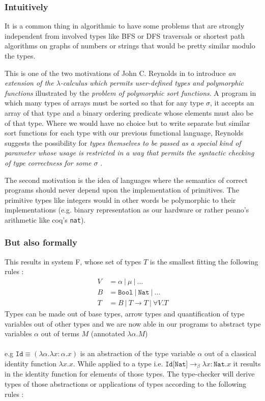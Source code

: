 \documentclass{article}
\begin{document}
    \subsubsection{Intuitively}
    It is a common thing in algorithmic to have some problems that are strongly independent from involved types like BFS or DFS traversals or shortest path algorithms on graphs of numbers or strings that would be pretty similar modulo the types.\par
    This is one of the two motivations of John C. Reynolds in \cite{Reynolds1974TowardsAT} to introduce \textit{an extension of the $\lambda$-calculus which permits user-defined types and polymorphic functions} illustrated by the \textit{problem of polymorphic sort functions}. A program in which many types of arrays must be sorted so that for any type $\sigma$, it accepts an array of that type and a binary ordering predicate whose elements must also be of that type. Where we would have no choice but to write separate but similar sort functions for each type with our previous functional language, Reynolds suggests the possibility for \textit{types themselves to be passed as a special kind of parameter whose usage is restricted in a way that permits the syntactic checking of type correctness for some $\sigma$ }.\par
    The second motivation is the idea of languages where the semantics of correct programs should never depend upon the implementation of primitives. The primitive types like integers would in other words be polymorphic to their implementations (e.g. binary representation as our hardware or rather peano's arithmetic like coq's \texttt{nat}).

    \subsubsection{But also formally}
    This results in system F, whose set of types $T$ is the smallest fitting the following rules :
    \begin{align}
        V &=\alpha \ | \ \mu \ | \  ... \tag{type variables} \\
        B &=\texttt{Bool} \ | \ \texttt{Nat} \ | \ ... \tag{base types}\\
        T &= B \ | \ T\rightarrow T \ | \ \forall V.T \tag{types}
    \end{align}
    Types can be made out of base types, arrow types and quantification of type variables out of other types and we are now able in our programs to abstract type variables $\alpha$ out of terms $M$ (annotated $\lambda \alpha.M$)
    \\\\
    e.g $\texttt{Id}\equiv(\lambda \alpha . \lambda x: \alpha.x)$ is an abstraction of the type variable $\alpha$ out of a classical identity function $\lambda x.x$. While applied to a type i.e. $\texttt{Id[Nat]} \rightarrow_\beta \lambda x: \texttt{Nat}.x$
     it results in the identity function for elements of those types. The type-checker will derive types of those abstractions or applications of types according to the following rules :
\end{document}
